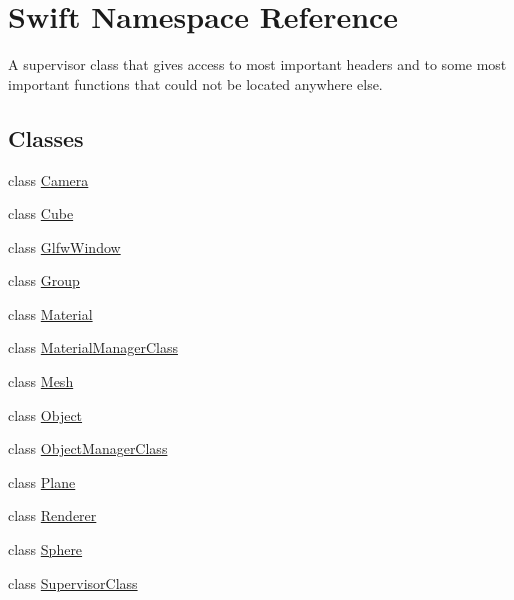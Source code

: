 \hypertarget{namespace_swift}{\section{Swift Namespace Reference}
\label{namespace_swift}
}


A supervisor class that gives access to most important headers and to some most important functions that could not be located anywhere else.  


\subsection*{Classes}
\begin{DoxyCompactItemize}
\item 
class \hyperlink{class_swift_1_1_camera}{Camera}
\item 
class \hyperlink{class_swift_1_1_cube}{Cube}
\item 
class \hyperlink{class_swift_1_1_glfw_window}{Glfw\-Window}
\item 
class \hyperlink{class_swift_1_1_group}{Group}
\item 
class \hyperlink{class_swift_1_1_material}{Material}
\item 
class \hyperlink{class_swift_1_1_material_manager_class}{Material\-Manager\-Class}
\item 
class \hyperlink{class_swift_1_1_mesh}{Mesh}
\item 
class \hyperlink{class_swift_1_1_object}{Object}
\item 
class \hyperlink{class_swift_1_1_object_manager_class}{Object\-Manager\-Class}
\item 
class \hyperlink{class_swift_1_1_plane}{Plane}
\item 
class \hyperlink{class_swift_1_1_renderer}{Renderer}
\item 
class \hyperlink{class_swift_1_1_sphere}{Sphere}
\item 
class \hyperlink{class_swift_1_1_supervisor_class}{Supervisor\-Class}
\end{DoxyCompactItemize}
